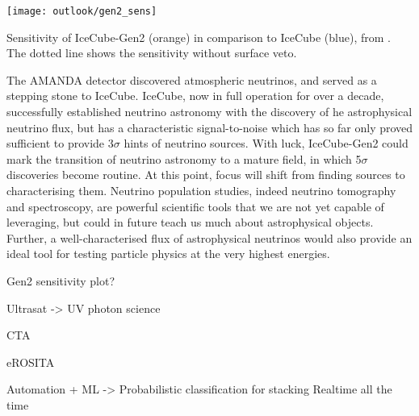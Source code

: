 \begin{marginfigure}
	\centering \texttt{[image: outlook/gen2\_sens]}
	\caption{Sensitivity of IceCube-Gen2 (orange) in comparison to IceCube (blue), from \cite{gen2_icrc}. The dotted line shows the sensitivity without surface veto.} 
	\label{fig:gen2_sens}
\end{marginfigure}

The AMANDA detector discovered atmospheric neutrinos, and served as a stepping stone to IceCube. IceCube, now in full operation for over a decade, successfully established neutrino astronomy with the discovery of he astrophysical neutrino flux, but has a characteristic signal-to-noise which has so far only proved sufficient to provide 3$\sigma$ hints of neutrino sources. With luck, IceCube-Gen2 could mark the transition of neutrino astronomy to a mature field, in which 5$\sigma$ discoveries become routine. At this point, focus will shift from finding sources to characterising them. Neutrino population studies, indeed neutrino tomography and spectroscopy, are powerful scientific tools that we are not yet capable of leveraging, but could in future teach us much about astrophysical objects. Further, a well-characterised flux of astrophysical neutrinos would also provide an ideal tool for testing particle physics at the very highest energies.

Gen2 sensitivity plot?

Ultrasat -> UV photon science

CTA

eROSITA

Automation + ML -> Probabilistic classification for stacking
Realtime all the time